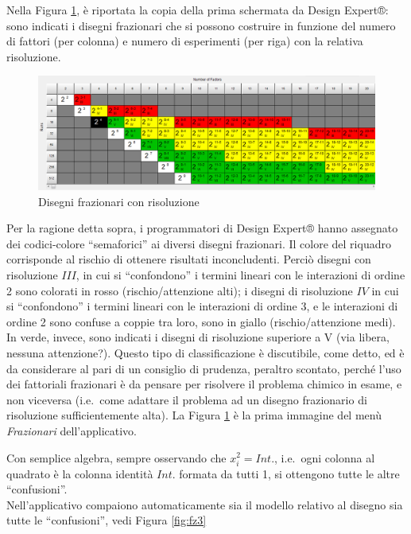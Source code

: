 \documentclass[
  11pt,
]{book}
\begin{document}
Nella Figura \ref{fig:fz2}, è riportata la copia della prima schermata da Design Expert®: sono indicati i disegni frazionari che si possono costruire in funzione del numero di fattori (per colonna) e numero di esperimenti (per riga) con la relativa risoluzione.

\begin{figure}[ht]

{\centering \includegraphics[width=1\linewidth]{Immagini/Fraz/02_risoluzione} 

}

\caption{Disegni frazionari con risoluzione}\label{fig:fz2}
\end{figure}

Per la ragione detta sopra, i programmatori di Design Expert® hanno assegnato dei codici-colore ``semaforici'' ai diversi disegni frazionari. Il colore del riquadro corrisponde al rischio di ottenere risultati inconcludenti. Perciò disegni con risoluzione \(III\), in cui si ``confondono'' i termini lineari con le interazioni di ordine 2 sono colorati in rosso (rischio/attenzione alti); i disegni di risoluzione \(IV\) in cui si ``confondono'' i termini lineari con le interazioni di ordine 3, e le interazioni di ordine 2 sono confuse a coppie tra loro, sono in giallo (rischio/attenzione medi). In verde, invece, sono indicati i disegni di risoluzione superiore a V (via libera, nessuna attenzione?). Questo tipo di classificazione è discutibile, come detto, ed è da considerare al pari di un consiglio di prudenza, peraltro scontato, perché l'uso dei fattoriali frazionari è da pensare per risolvere il problema chimico in esame, e non viceversa (i.e.~come adattare il problema ad un disegno frazionario di risoluzione sufficientemente alta).
La Figura \ref{fig:fz2} è la prima immagine del menù \emph{Frazionari} dell'applicativo.

Con semplice algebra, sempre osservando che \(x_i^2=Int.\), i.e.~ogni colonna al quadrato è la colonna identità \(Int.\) formata da tutti 1, si ottengono tutte le altre ``confusioni''.\\
Nell'applicativo compaiono automaticamente sia il modello relativo al disegno sia tutte le ``confusioni'', vedi Figura \ref{fig:fz3}
\end{document}
